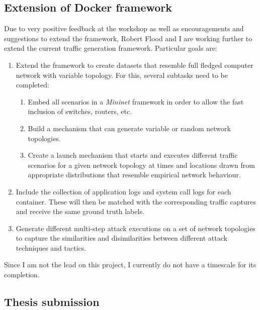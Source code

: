\documentclass[a4paper,12pt,twoside]{article}
\begin{document}
\subsection{Extension of Docker framework}\label{Sec:dockerext}

Due to very positive feedback at the workshop as well as encouragements and suggestions to extend the framework, Robert Flood and I are working further to extend the current traffic generation framework. Particular goals are:

\begin{enumerate}
\item Extend the framework to create datasets that resemble full fledged computer network with variable topology. For this, several subtasks need to be completed:

\begin{enumerate}

\item Embed all scenarios in a \textit{Mininet} framework in order to allow the fast inclusion of switches, routers, etc.

\item Build a mechanism that can generate variable or random network topologies.

\item Create a launch mechanism that starts and executes different traffic scenarios for a given network topology at times and locations drawn from appropriate distributions that resemble empirical network behaviour.

\end{enumerate}
\item Include the collection of application logs and system call logs for each container. These will then be matched with the corresponding traffic captures and receive the same ground truth labels.

\item Generate different multi-step attack executions on a set of network topologies to capture the similarities and disimilarities between different attack techniques and tactics.

\end{enumerate}

Since I am not the lead on this project, I currently do not have a timescale for its completion.


\subsection{Thesis submission}
\end{document}

